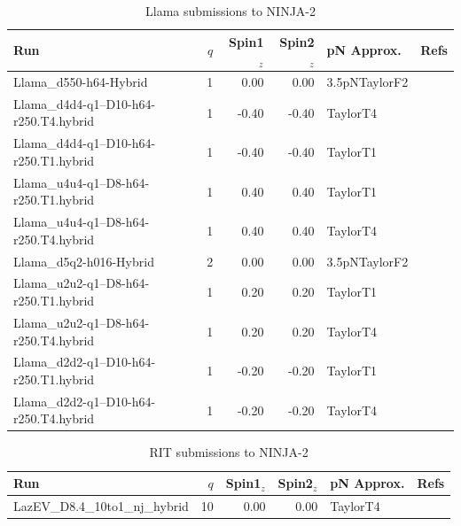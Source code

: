 \begin{table}
\begin{center}
\begin{tabular}{|l|r|r|r|l|c|}
\hline
Run & $q$ & Spin1${}_z$ & Spin2${}_z$ & pN Approx. & Refs \\
\hline
Llama\_d550-h64-Hybrid & 1 & 0.00 & 0.00 & 3.5pNTaylorF2 & \cite{Reisswig:2009rx,Reisswig:2009rx} \\
Llama\_d4d4-q1--D10-h64-r250.T4.hybrid & 1 & -0.40 & -0.40 & TaylorT4 & \cite{Pollney:2010hs,Pollney:2009yz,} \\
Llama\_d4d4-q1--D10-h64-r250.T1.hybrid & 1 & -0.40 & -0.40 & TaylorT1 & \cite{Pollney:2010hs,Pollney:2009yz,} \\
Llama\_u4u4-q1--D8-h64-r250.T1.hybrid & 1 & 0.40 & 0.40 & TaylorT1 & \cite{Pollney:2010hs,Pollney:2009yz,} \\
Llama\_u4u4-q1--D8-h64-r250.T4.hybrid & 1 & 0.40 & 0.40 & TaylorT4 & \cite{Pollney:2010hs,Pollney:2009yz,} \\
Llama\_d5q2-h016-Hybrid & 2 & 0.00 & 0.00 & 3.5pNTaylorF2 & \cite{,Reisswig:2009rx} \\
Llama\_u2u2-q1--D8-h64-r250.T1.hybrid & 1 & 0.20 & 0.20 & TaylorT1 & \cite{Pollney:2010hs,Pollney:2009yz,} \\
Llama\_u2u2-q1--D8-h64-r250.T4.hybrid & 1 & 0.20 & 0.20 & TaylorT4 & \cite{Pollney:2010hs,Pollney:2009yz,} \\
Llama\_d2d2-q1--D10-h64-r250.T1.hybrid & 1 & -0.20 & -0.20 & TaylorT1 & \cite{Pollney:2010hs,Pollney:2009yz,} \\
Llama\_d2d2-q1--D10-h64-r250.T4.hybrid & 1 & -0.20 & -0.20 & TaylorT4 & \cite{Pollney:2010hs,Pollney:2009yz,} \\
\hline
\end{tabular}
\end{center}
\caption[Llama submissions to NINJA-2]{
\label{tab:ninja2_llama}
Llama submissions to NINJA-2}
\end{table}

\begin{table}
\begin{center}
\begin{tabular}{|l|r|r|r|l|c|}
\hline
Run & $q$ & Spin1${}_z$ & Spin2${}_z$ & pN Approx. & Refs \\
\hline
LazEV\_D8.4\_10to1\_nj\_hybrid & 10 & 0.00 & 0.00 & TaylorT4 & \cite{Campanelli:2005dd} \\
\hline
\end{tabular}
\end{center}
\caption[RIT submissions to NINJA-2]{
\label{tab:ninja2_rit}
RIT submissions to NINJA-2}
\end{table}

